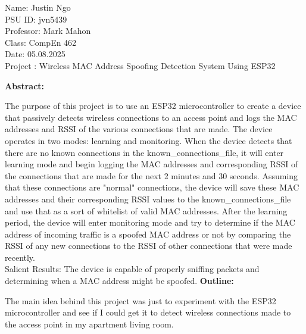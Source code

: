 \documentclass[letterpaper, 11pt]{article}
\def\class{CompEn 462}
\def\date{05.08.2025}
\def\professor{Mark Mahon}
\newcommand{\secHeader}[1]{\vspace{2mm} \noindent \textbf{#1:}\vspace{-4mm}}
\begin{document}
\hfill
\newline
Name: Justin Ngo
\\PSU ID: jvn5439
\\Professor: \professor
\\Class: \class
\\Date: \date
\\Project : Wireless MAC Address Spoofing Detection System Using ESP32

\newpage
\secHeader{Abstract}
\vspace{5mm}

The purpose of this project is to use an ESP32 microcontroller to create a device that passively detects wireless connections to an access point and logs the MAC addresses and RSSI of the various
connections that are made. The device operates in two modes: learning and monitoring. When the device detects that there are no known connections in the known\_connections\_file, it will enter
learning mode and begin logging the MAC addresses and corresponding RSSI of the connections that are made for the next 2 minutes and 30 seconds. Assuming that these connections are "normal" connections,
the device will save these MAC addresses and their corresponding RSSI values to the known\_connections\_file and use that as a sort of whitelist of valid MAC addresses. 
After the learning period, the device will enter monitoring mode and try to determine if the MAC address of incoming traffic is a spoofed MAC address or not by comparing the RSSI of any new connections
to the RSSI of other connections that were made recently. \\ 

Salient Results: The device is capable of properly sniffing packets and determining when a MAC address might be spoofed.
\newpage
\secHeader{Outline}
\vspace{5mm}

The main idea behind this project was just to experiment with the ESP32 microcontroller and see if I could get it to detect wireless connections made to the access point in my apartment living room.
\end{document}
